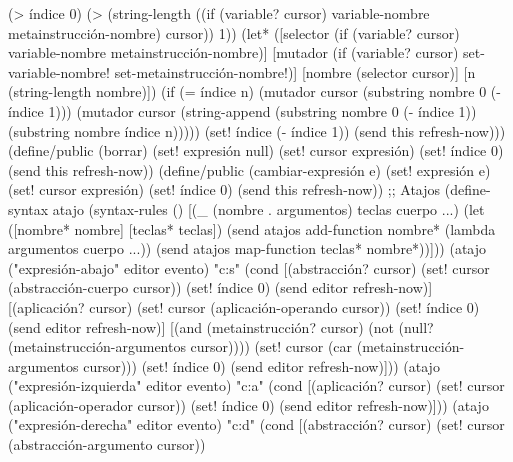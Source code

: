 \documentclass[10pt,oneside,openany,letterpaper]{book}
\begin{document}
                 (> índice 0)
                 (> (string-length ((if (variable? cursor)
                                        variable-nombre
                                        metainstrucción-nombre)
                                    cursor))
                    1))
        (let* ([selector (if (variable? cursor) variable-nombre metainstrucción-nombre)]
               [mutador (if (variable? cursor) set-variable-nombre! set-metainstrucción-nombre!)]
               [nombre (selector cursor)]
               [n (string-length nombre)])
          (if (= índice n)
              (mutador cursor
                       (substring nombre 0 (- índice 1)))
              (mutador cursor
                       (string-append (substring nombre 0 (- índice 1))
                                      (substring nombre índice n)))))
        (set! índice (- índice 1))
        (send this refresh-now)))
    (define/public (borrar)
      (set! expresión null)
      (set! cursor expresión)
      (set! índice 0)
      (send this refresh-now))
    (define/public (cambiar-expresión e)
      (set! expresión e)
      (set! cursor expresión)
      (set! índice 0)
      (send this refresh-now))
    ;; Atajos
    (define-syntax atajo
      (syntax-rules ()
        [(_ (nombre . argumentos) teclas cuerpo ...)
         (let ([nombre* nombre]
               [teclas* teclas])
           (send atajos add-function nombre*
                 (lambda argumentos
                   cuerpo ...))
           (send atajos map-function teclas* nombre*))]))
    (atajo ("expresión-abajo" editor evento) "c:s"
           (cond [(abstracción? cursor)
                  (set! cursor (abstracción-cuerpo cursor))
                  (set! índice 0)
                  (send editor refresh-now)]
                 [(aplicación? cursor)
                  (set! cursor (aplicación-operando cursor))
                  (set! índice 0)
                  (send editor refresh-now)]
                 [(and (metainstrucción? cursor)
                       (not (null? (metainstrucción-argumentos cursor))))
                  (set! cursor (car (metainstrucción-argumentos cursor)))
                  (set! índice 0)
                  (send editor refresh-now)]))
    (atajo ("expresión-izquierda" editor evento) "c:a"
           (cond [(aplicación? cursor)
                  (set! cursor (aplicación-operador cursor))
                  (set! índice 0)
                  (send editor refresh-now)]))
    (atajo ("expresión-derecha" editor evento) "c:d"
           (cond [(abstracción? cursor)
                  (set! cursor (abstracción-argumento cursor))
\end{document}

